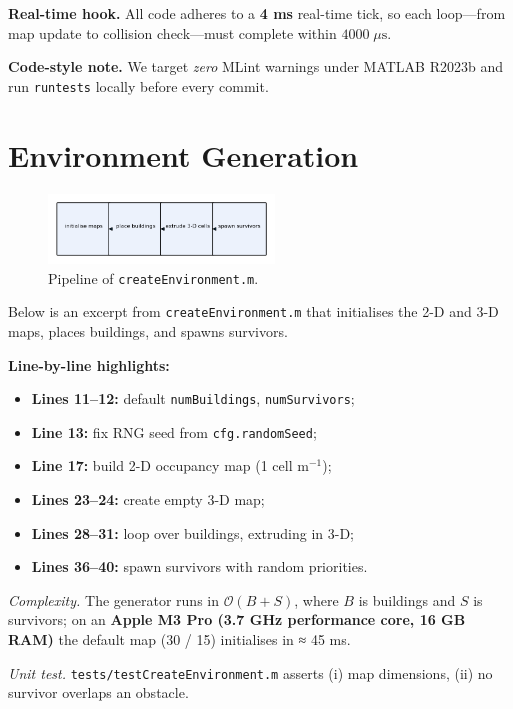 \documentclass[12pt,a4paper]{report}
\begin{document}
\textbf{Real-time hook.}  
All code adheres to a \textbf{4 ms} real-time tick, so each loop—from map update to
collision check—must complete within \(4000\;\mu\text{s}\).

\textbf{Code-style note.}  
We target \emph{zero} MLint warnings under MATLAB R2023b and run \texttt{runtests}
locally before every commit.

\section{Environment Generation}
\label{sec:env_generation}

\begin{figure}[h]
  \centering
  \includegraphics[width=6cm]{figures/env_pipeline}
  \caption{Pipeline of \texttt{createEnvironment.m}.}
  \label{fig:envPipeline}
\end{figure}

Below is an excerpt from \texttt{createEnvironment.m} that initialises the 2-D and
3-D maps, places buildings, and spawns survivors.

\textbf{Line-by-line highlights:}
\begin{itemize}
  \item \textbf{Lines 11–12:} default \texttt{numBuildings}, \texttt{numSurvivors};
  \item \textbf{Line 13:} fix RNG seed from \texttt{cfg.randomSeed};
  \item \textbf{Line 17:} build 2-D occupancy map (1 cell m\(^{-1}\));
  \item \textbf{Lines 23–24:} create empty 3-D map;
  \item \textbf{Lines 28–31:} loop over buildings, extruding in 3-D;
  \item \textbf{Lines 36–40:} spawn survivors with random priorities.
\end{itemize}

\flushleft
\emph{Complexity.}  
The generator runs in \(\mathcal{O}(B+S)\), where \(B\) is buildings and \(S\) is
survivors; on an \textbf{Apple M3 Pro (3.7 GHz performance core, 16 GB RAM)}
the default map (30 / 15) initialises in ≈ 45 ms.

\emph{Unit test.}  \texttt{tests/testCreateEnvironment.m} asserts  
(i) map dimensions, (ii) no survivor overlaps an obstacle.
\end{document}
